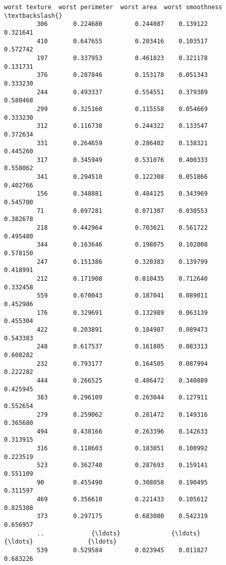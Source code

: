 \documentclass[11pt]{article}
\begin{document}
\begin{Verbatim}[commandchars=\\\{\}]
              worst texture  worst perimeter  worst area  worst smoothness  \textbackslash{}
         306       0.224680         0.244087    0.139122          0.321641   
         410       0.647655         0.203416    0.103517          0.572742   
         197       0.337953         0.461823    0.321178          0.131731   
         376       0.287846         0.153178    0.051343          0.333230   
         244       0.493337         0.554551    0.379389          0.580468   
         299       0.325160         0.115558    0.054669          0.333230   
         312       0.116738         0.244322    0.133547          0.372634   
         331       0.264659         0.286402    0.138321          0.445260   
         317       0.345949         0.531076    0.400333          0.558062   
         341       0.294510         0.122308    0.051866          0.402766   
         156       0.348881         0.484125    0.343969          0.545700   
         71        0.097281         0.071307    0.030553          0.382678   
         218       0.442964         0.703621    0.561722          0.495480   
         344       0.163646         0.198075    0.102008          0.578150   
         247       0.151386         0.320383    0.139799          0.418991   
         212       0.171908         0.810435    0.712640          0.332458   
         559       0.670043         0.187041    0.089011          0.452986   
         176       0.329691         0.132989    0.063139          0.455304   
         422       0.203891         0.184987    0.089473          0.543383   
         248       0.617537         0.161805    0.083313          0.608282   
         232       0.793177         0.164505    0.087994          0.222282   
         444       0.266525         0.486472    0.340889          0.425945   
         383       0.296109         0.263044    0.127911          0.552654   
         279       0.259062         0.281472    0.149316          0.365680   
         494       0.438166         0.263396    0.142633          0.313915   
         316       0.118603         0.183051    0.100992          0.223519   
         523       0.362740         0.287693    0.159141          0.551109   
         90        0.455490         0.308058    0.190495          0.311597   
         469       0.356610         0.221433    0.105612          0.825388   
         373       0.297175         0.683080    0.542319          0.656957   
         ..             {\ldots}              {\ldots}         {\ldots}               {\ldots}   
         539       0.529584         0.023945    0.011827          0.683226   

\end{Verbatim}
\end{document}

